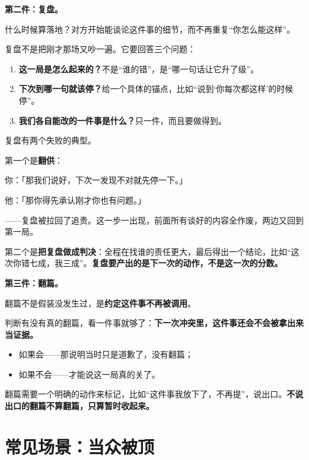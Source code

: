 \textbf{第二件：复盘。}

\begin{alertbox}[前提：只能在双方情绪落地之后进行。]
什么时候算落地？对方开始能谈论这件事的细节，而不再重复“你怎么能这样”。
\end{alertbox}

复盘不是把刚才那场又吵一遍。它要回答三个问题：

\begin{enumerate}
\item \textbf{这一局是怎么起来的？}不是“谁的错”，是“哪一句话让它升了级”。
\item \textbf{下次到哪一句就该停？}给一个具体的锚点，比如“说到‘你每次都这样’的时候停”。
\item \textbf{我们各自能改的一件事是什么？}只一件，而且要做得到。
\end{enumerate}

复盘有两个失败的典型。

第一个是\textbf{翻供}：

\par
\begin{mdquote}
你：「那我们说好，下次一发现不对就先停一下。」\par
他：「那你得先承认刚才你也有问题。」\par
——复盘被拉回了追责。这一步一出现，前面所有谈好的内容全作废，两边又回到第一局。
\end{mdquote}

第二个是\textbf{把复盘做成判决}：全程在找谁的责任更大，最后得出一个结论，比如“这次你错七成，我三成”。\textbf{复盘要产出的是下一次的动作，不是这一次的分数。}

\textbf{第三件：翻篇。}

翻篇不是假装没发生过，是\textbf{约定这件事不再被调用}。

判断有没有真的翻篇，看一件事就够了：\textbf{下一次冲突里，这件事还会不会被拿出来当证据。}

\begin{itemize}
\item 如果会——那说明当时只是道歉了，没有翻篇；
\item 如果不会——才能说这一局真的关了。
\end{itemize}

翻篇需要一个明确的动作来标记，比如“这件事我放下了，不再提”，说出口。\textbf{不说出口的翻篇不算翻篇，只算暂时收起来。}

\section{常见场景：当众被顶}

